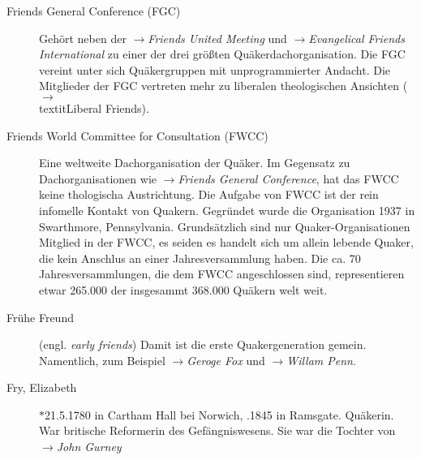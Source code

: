 \begin{description}
 \item[Friends General Conference (FGC)] Gehört neben der
 $\to$\textit{Friends United Meeting} und $\to$\textit{Evangelical Friends
 International} zu einer der drei größten Quäkerdachorganisation. Die FGC
 vereint unter sich Quäkergruppen mit unprogrammierter Andacht. Die Mitglieder
 der FGC vertreten mehr zu liberalen theologischen Ansichten
 ($\to$\\textit{Liberal Friends}). 



 \item[Friends World Committee for Consultation (FWCC)] Eine weltweite
 Dachorganisation der Quäker. Im Gegensatz zu Dachorganisationen wie
 $\to$\textit{Friends General Conference}, hat das FWCC keine thologischa
 Austrichtung. Die Aufgabe von FWCC ist der rein infomelle Kontakt von Quakern.
 Gegründet wurde die Organisation 1937 in Swarthmore, Pennsylvania.
 Grundsätzlich sind nur Quaker-Organisationen Mitglied in der FWCC, es seiden
 es handelt sich um allein lebende Quaker, die kein Anschlus an einer
 Jahresversammlung haben. Die ca. 70 Jahresversammlungen, die dem FWCC
 angeschlossen sind, representieren etwar 265.000 der insgesammt 368.000
 Quäkern welt weit.



 \item[Frühe Freund] (engl. \textit{early friends}) Damit ist die erste
 Quakergeneration gemein. Namentlich, zum Beispiel $\to$\textit{Geroge Fox}
 und $\to$\textit{Willam Penn}.


 \item[Fry, Elizabeth] $\ast$21.5.1780 in Cartham Hall bei Norwich,
 .1845 in Ramsgate. Quäkerin. War britische Reformerin des
 Gefängniswesens. Sie war die Tochter von $\to$\textit{John Gurney}

 \end{description}

\normalsize